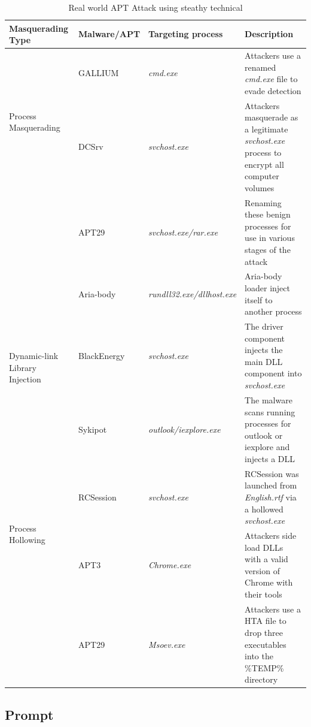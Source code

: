 \begin{table}
    \centering
    \begin{tabular}{|l|l|l|p{6cm}|}
        \hline
        Masquerading Type & Malware/APT & Targeting process & Description \\
        \hline
        \multirow{2}{*}{Process Masquerading}
        & GALLIUM\cite{cybereason2023} & \textit{cmd.exe} & Attackers use a renamed \textit{cmd.exe} file to evade detection \\
        \cline{2-4}
        & DCSrv\cite{checkpoint2021} & \textit{svchost.exe} & Attackers masquerade as a legitimate \textit{svchost.exe} process to encrypt all computer volumes \\
        \cline{2-4}
        & APT29\cite{mitre_g0016} & \textit{svchost.exe/rar.exe} & Renaming these benign processes for use in various stages of the attack \\
        \hline
        \multirow{3}{*}{Dynamic-link Library Injection} & Aria-body\cite{checkpoint2020} & \textit{rundll32.exe/dllhost.exe} & Aria-body loader inject itself to another process \\
        \cline{2-4}
        & BlackEnergy\cite{fsecure2019} & \textit{svchost.exe} & The driver component injects the main DLL component into \textit{svchost.exe} \\
        \cline{2-4}
        & Sykipot\cite{att2023} & \textit{outlook/iexplore.exe} & The malware scans running processes for outlook or iexplore and injects a DLL \\
        \hline
        \multirow{2}{*}{Process Hollowing} & RCSession\cite{secureworks} & \textit{svchost.exe} & RCSession was launched from \textit{English.rtf} via a hollowed \textit{svchost.exe} \\
        \hline
        \multirow{2}{*}{Dll side-Loading} & APT3\cite{mitre_g0022} & \textit{Chrome.exe} & Attackers side load DLLs with a valid version of Chrome with their tools \\
        \cline{2-4}
        & APT29\cite{mitre_g0016} & \textit{Msoev.exe} & Attackers use a HTA file to drop three executables into the \%TEMP\% directory \\
        \hline
    \end{tabular}
    \caption{Real world APT Attack using steathy technical}
    \label{tab:real_world}
\end{table}




\subsection{Prompt}


